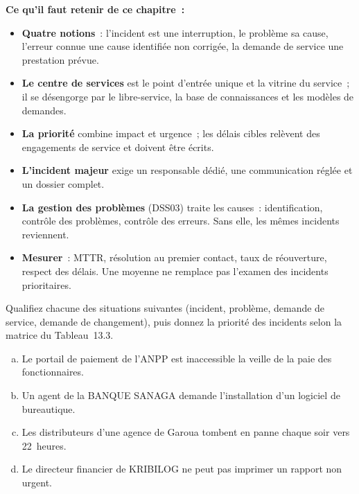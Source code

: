 \begin{boxresume}
\textbf{Ce qu'il faut retenir de ce chapitre~:}
\begin{itemize}
    \item \textbf{Quatre notions}~: l'incident est une interruption, le
          problème sa cause, l'erreur connue une cause identifiée non
          corrigée, la demande de service une prestation prévue.
    \item \textbf{Le centre de services} est le point d'entrée unique et la
          vitrine du service~; il se désengorge par le libre-service, la
          base de connaissances et les modèles de demandes.
    \item \textbf{La priorité} combine impact et urgence~; les délais cibles
          relèvent des engagements de service et doivent être écrits.
    \item \textbf{L'incident majeur} exige un responsable dédié, une
          communication réglée et un dossier complet.
    \item \textbf{La gestion des problèmes} (DSS03) traite les causes~:
          identification, contrôle des problèmes, contrôle des erreurs.
          Sans elle, les mêmes incidents reviennent.
    \item \textbf{Mesurer}~: MTTR, résolution au premier contact, taux de
          réouverture, respect des délais. Une moyenne ne remplace pas
          l'examen des incidents prioritaires.
\end{itemize}
\end{boxresume}

\bigskip

\begin{boxexo}[title={\ding{45}\quad Exercice~13.1. Qualifier et prioriser \niveaubase}]
Qualifiez chacune des situations suivantes (incident, problème, demande de
service, demande de changement), puis donnez la priorité des incidents
selon la matrice du Tableau~13.3.
\begin{enumerate}[(a)]
    \item Le portail de paiement de l'ANPP est inaccessible la veille de la
          paie des fonctionnaires.
    \item Un agent de la BANQUE SANAGA demande l'installation d'un logiciel
          de bureautique.
    \item Les distributeurs d'une agence de Garoua tombent en panne chaque
          soir vers 22~heures.
    \item Le directeur financier de KRIBILOG ne peut pas imprimer un
          rapport non urgent.
\end{enumerate}
\end{boxexo}

